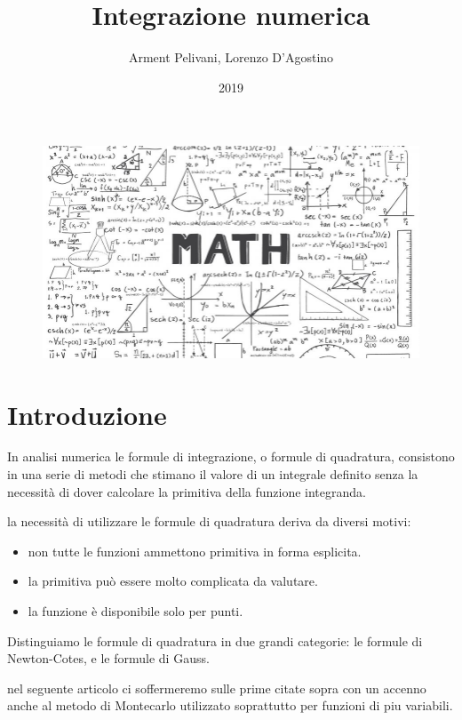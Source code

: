 \documentclass{article}
\title{Integrazione numerica}
\author{Arment Pelivani, Lorenzo D'Agostino}
\date{2019}
\begin{document}
\maketitle
\begin{center}
\begin{figure}[ht]

\includegraphics[scale=0.6]{img/math-emporium.jpg} 
\label{fig:trasl}
\end{figure}

\end{center}

\newpage
\tableofcontents
\newpage
\section{Introduzione}
In analisi numerica le formule di integrazione, o formule di quadratura, consistono in una serie di metodi che stimano il valore di un integrale definito senza la necessità di dover calcolare la primitiva della funzione integranda.

la necessità di utilizzare le formule di quadratura deriva da diversi motivi:
\begin{itemize}
\item non tutte le funzioni ammettono primitiva in forma esplicita.
\item la primitiva può essere molto complicata da valutare.
\item la funzione è disponibile solo per punti.
\end{itemize}
Distinguiamo le formule di quadratura in due grandi categorie: le formule di Newton-Cotes, e le formule di Gauss.

nel seguente articolo ci soffermeremo sulle prime citate sopra con un accenno anche al metodo di Montecarlo utilizzato soprattutto per funzioni di piu variabili.
\end{document}
